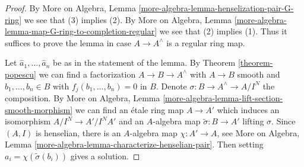 \begin{proof}
By More on Algebra, Lemma
\ref{more-algebra-lemma-henselization-pair-G-ring}
we see that (3) implies (2). By More on Algebra, Lemma
\ref{more-algebra-lemma-map-G-ring-to-completion-regular}
we see that (2) implies (1).
Thus it suffices to prove the lemma in case $A \to A^\wedge$ is
a regular ring map.

\medskip\noindent
Let $\hat{a}_1, \ldots, \hat{a}_n$ be as in the statement of the lemma.
By Theorem \ref{theorem-popescu} we can find a factorization
$A \to B \to A^\wedge$ with $A \to B$ smooth and
$b_1, \ldots, b_n \in B$ with $f_j(b_1, \ldots, b_n) = 0$ in $B$.
Denote $\sigma : B \to A^\wedge \to A/I^N$ the composition.
By More on Algebra, Lemma \ref{more-algebra-lemma-lift-section-smooth-morphism}
we can find an \'etale ring
map $A \to A'$ which induces an isomorphism $A/I^N \to A'/I^NA'$
and an $A$-algebra map $\tilde \sigma : B \to A'$ lifting $\sigma$.
Since $(A, I)$ is henselian, there is an $A$-algebra map $\chi : A' \to A$,
see More on Algebra, Lemma \ref{more-algebra-lemma-characterize-henselian-pair}.
Then setting $a_i = \chi(\tilde \sigma(b_i))$ gives a solution.
\end{proof}










